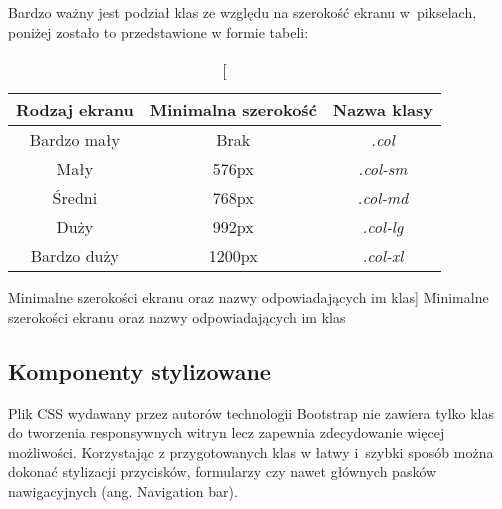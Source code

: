 \documentclass[../Kamil_Kowalewski_Main.tex]{subfiles}
\begin{document}
{{{            Bardzo ważny jest podział klas ze względu na szerokość ekranu w~pikselach,
            poniżej zostało to przedstawione w formie tabeli:
            \begin{table}[H]
                \centering
                \begin{tabular}{|c|c|c|}
                    \hline
                    Rodzaj ekranu & Minimalna szerokość & Nazwa klasy \\ \hline
                    Bardzo mały & Brak & \textit{.col} \\ \hline
                    Mały & 576px & \textit{.col-sm}  \\ \hline
                    Średni & 768px & \textit{.col-md}  \\ \hline
                    Duży & 992px & \textit{.col-lg}  \\ \hline
                    Bardzo duży & 1200px & \textit{.col-xl}  \\ \hline
                \end{tabular}
                \caption
                [Minimalne szerokości ekranu oraz nazwy odpowiadających im klas]
                {Minimalne szerokości ekranu oraz nazwy odpowiadających im klas}
                \label{chapter3:technologie:bootstrap:siatka:col_size}
            \end{table}
        }

        \subsection{Komponenty stylizowane}
        \label{chapter3:technologie:bootstrap:komponenty} {
            Plik CSS wydawany przez autorów technologii Bootstrap nie zawiera tylko
            klas do tworzenia responsywnych witryn lecz zapewnia zdecydowanie więcej
            możliwości. Korzystając z przygotowanych klas w łatwy i~szybki sposób
            można dokonać stylizacji przycisków, formularzy czy nawet głównych pasków
            nawigacyjnych (ang. Navigation bar).
        }

}}
\end{document}
